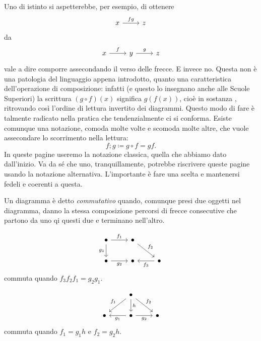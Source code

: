 \begin{nota}
Uno di istinto si aspetterebbe, per esempio, di ottenere
\[\begin{tikzcd}
x \ar["fg",r] & z
\end{tikzcd}\]
da
\[\begin{tikzcd}
x \ar["f",r] & y \ar["g",r] & z
\end{tikzcd}\]
vale a dire comporre assecondando il verso delle frecce. E invece no. Questa non è una patologia del linguaggio appena introdotto, quanto una caratteristica dell'operazione di composizione: infatti (e questo lo insegnano anche alle Scuole Superiori) la scrittura \((g \circ f)(x)\) significa \(g(f(x))\), cioè in sostanza , ritrovando così l'ordine di lettura invertito dei diagrammi. Questo modo di fare è talmente radicato nella pratica che tendenzialmente ci si conforma. Esiste comunque una notazione, comoda molte volte e scomoda molte altre, che vuole assecondare lo scorrimento nella lettura:
\[f;g \coloneq g \circ f = g f .\]
In queste pagine useremo la notazione classica, quella che abbiamo dato dall'inizio. Va da sé che uno, tranquillamente, potrebbe riscrivere queste pagine usando la notazione alternativa. L'importante è fare una scelta e mantenersi fedeli e coerenti a questa.
\end{nota}

Un diagramma è detto {\em commutativo} quando, comunque presi due oggetti nel diagramma, danno la stessa composizione percorsi di frecce consecutive che partono da uno qi questi due e terminano nell'altro.

\begin{esempio}
\[\begin{tikzcd}
\bullet \ar["f_1",r] \ar["g_1",d,swap] & \bullet \ar["f_2",dr] & \\
\bullet \ar["g_2",r,swap] & \bullet & \bullet \ar["f_3",l]
\end{tikzcd}\]
commuta quando \(f_3f_2f_1 = g_2g_1\).
\end{esempio}

\begin{esempio}
\[\begin{tikzcd}
& \bullet \ar["f_1",dl,swap] \ar["h",d] \ar["f_2",dr] & \\
\bullet & \bullet \ar["g_1",l] \ar["g_2",r,swap] & \bullet
\end{tikzcd}\]
commuta quando \(f_1 = g_1h\) e \(f_2 = g_2h\).
\end{esempio}

